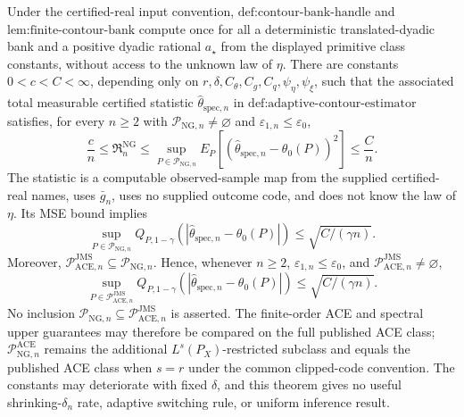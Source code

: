 Under the certified-real input convention, \(\text{def:contour-bank-handle}\) and \(\text{lem:finite-contour-bank}\) compute once for all a deterministic translated-dyadic bank and a positive dyadic rational \(a_{\star}\) from the displayed primitive class constants, without access to the unknown law of \(\eta\). There are constants \(0<c<C<\infty\), depending only on \(r,\delta,C_{\theta},C_g,C_q,\psi_{\eta},\psi_{\xi}\), such that the associated total measurable certified statistic \(\widehat\theta_{\mathrm{spec},n}\) in \(\text{def:adaptive-contour-estimator}\) satisfies, for every \(n\ge2\) with \(\mathcal P_{\mathrm{NG},n}\neq\varnothing\) and \(\varepsilon_{1,n}\le\varepsilon_0\),
\[
 \frac cn\le\mathfrak R_n^{\mathrm{NG}}
 \le\sup_{P\in\mathcal P_{\mathrm{NG},n}}
 E_P[(\widehat\theta_{\mathrm{spec},n}-\theta_0(P))^2]
 \le\frac Cn.
\]
The statistic is a computable observed-sample map from the supplied certified-real names, uses \(\bar g_n\), uses no supplied outcome code, and does not know the law of \(\eta\). Its MSE bound implies
\[
 \sup_{P\in\mathcal P_{\mathrm{NG},n}}
 Q_{P,1-\gamma}(|\widehat\theta_{\mathrm{spec},n}-\theta_0(P)|)
 \le\sqrt{C/(\gamma n)}.
\]
Moreover, \(\mathcal P_{\mathrm{ACE},n}^{\mathrm{JMS}}\subseteq\mathcal P_{\mathrm{NG},n}\). Hence, whenever \(n\ge2\), \(\varepsilon_{1,n}\le\varepsilon_0\), and \(\mathcal P_{\mathrm{ACE},n}^{\mathrm{JMS}}\neq\varnothing\),
\[
 \sup_{P\in\mathcal P_{\mathrm{ACE},n}^{\mathrm{JMS}}}
 Q_{P,1-\gamma}(|\widehat\theta_{\mathrm{spec},n}-\theta_0(P)|)
 \le\sqrt{C/(\gamma n)}.
\]
No inclusion \(\mathcal P_{\mathrm{NG},n}\subseteq\mathcal P_{\mathrm{ACE},n}^{\mathrm{JMS}}\) is asserted. The finite-order ACE and spectral upper guarantees may therefore be compared on the full published ACE class; \(\mathcal P_{\mathrm{NG},n}^{\mathrm{ACE}}\) remains the additional \(L^s(P_X)\)-restricted subclass and equals the published ACE class when \(s=r\) under the common clipped-code convention. The constants may deteriorate with fixed \(\delta\), and this theorem gives no useful shrinking-\(\delta_n\) rate, adaptive switching rule, or uniform inference result.